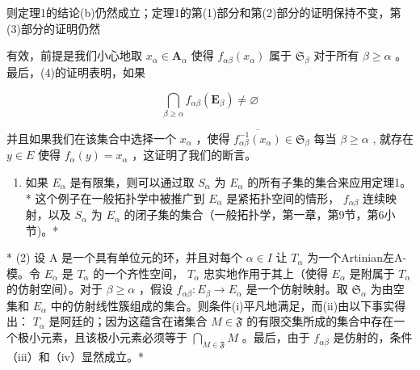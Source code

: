 则定理1的结论(b)仍然成立；定理1的第(1)部分和第(2)部分的证明保持不变，第(3)部分的证明仍然

有效，前提是我们小心地取 \(x_{\alpha} \in \mathbf{A}_{\alpha}\) 使得 \(f_{\alpha \beta}(x_{\alpha})\) 属于 \(\mathfrak{S}_{\beta}\) 对于所有 \(\beta \geqslant \alpha\) 。最后，(4)的证明表明，如果

\[
\bigcap_ {\beta \geqslant \alpha} f _ {\alpha \beta} (\mathbf {E} _ {\beta}) \neq \varnothing
\]

并且如果我们在该集合中选择一个 \(x_{\alpha}\) ，使得 \(\overline{f_{\alpha\beta}^{-1}(x_{\alpha})} \in \mathfrak{S}_{\beta}\) 每当 \(\beta \geqslant \alpha\) , 就存在 \(y \in E\) 使得 \(f_{\alpha}(y) = x_{\alpha}\) ，这证明了我们的断言。


\begin{enumerate}
\def\labelenumi{(\arabic{enumi})}
\tightlist
\item
  如果 \(E_{\alpha}\) 是有限集，则可以通过取 \(S_{\alpha}\) 为 \(E_{\alpha}\) 的所有子集的集合来应用定理1。* 这个例子在一般拓扑学中被推广到 \(E_{\alpha}\) 是紧拓扑空间的情形， \(f_{\alpha\beta}\) 连续映射，以及 \(S_{\alpha}\) 为 \(E_{\alpha}\) 的闭子集的集合（一般拓扑学，第一章，第9节，第6小节)。*
\end{enumerate}

* (2) 设 A 是一个具有单位元的环，并且对每个 \(\alpha \in I\) 让 \(T_{\alpha}\) 为一个Artinian左A-模。令 \(E_{\alpha}\) 是 \(T_{\alpha}\) 的一个齐性空间， \(T_{\alpha}\) 忠实地作用于其上（使得 \(E_{\alpha}\) 是附属于 \(T_{\alpha}\) 的仿射空间）。对于 \(\beta \geqslant \alpha\) ，假设 \(f_{\alpha \beta}: E_{\beta} \to E_{\alpha}\) 是一个仿射映射。取 \(\mathfrak{S}_{\alpha}\) 为由空集和 \(E_{\alpha}\) 中的仿射线性簇组成的集合。则条件(i)平凡地满足，而(ii)由以下事实得出： \(T_{\alpha}\) 是阿廷的；因为这蕴含在诸集合 \(M \in \mathfrak{F}\) 的有限交集所成的集合中存在一个极小元素，且该极小元素必须等于 \(\bigcap_{M \in \mathfrak{F}} M\) 。最后，由于 \(f_{\alpha \beta}\) 是仿射的，条件（iii）和（iv）显然成立。*

